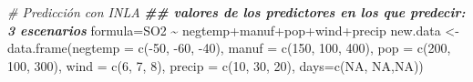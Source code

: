 \documentclass[
]{book}
\newenvironment{Shaded}{\begin{snugshade}}{\end{snugshade}}
\newcommand{\AttributeTok}[1]{\textcolor[rgb]{0.77,0.63,0.00}{#1}}
\newcommand{\CommentTok}[1]{\textcolor[rgb]{0.56,0.35,0.01}{\textit{#1}}}
\newcommand{\ConstantTok}[1]{\textcolor[rgb]{0.00,0.00,0.00}{#1}}
\newcommand{\DecValTok}[1]{\textcolor[rgb]{0.00,0.00,0.81}{#1}}
\newcommand{\DocumentationTok}[1]{\textcolor[rgb]{0.56,0.35,0.01}{\textbf{\textit{#1}}}}
\newcommand{\FunctionTok}[1]{\textcolor[rgb]{0.00,0.00,0.00}{#1}}
\newcommand{\NormalTok}[1]{#1}
\newcommand{\OtherTok}[1]{\textcolor[rgb]{0.56,0.35,0.01}{#1}}
\newcommand{\SpecialCharTok}[1]{\textcolor[rgb]{0.00,0.00,0.00}{#1}}
\begin{document}
\begin{Shaded}
\begin{Highlighting}[]
\CommentTok{\# Predicción con INLA}
\DocumentationTok{\#\# valores de los predictores en los que predecir: 3 escenarios}
\NormalTok{formula}\OtherTok{=}\NormalTok{SO2 }\SpecialCharTok{\textasciitilde{}}\NormalTok{ negtemp}\SpecialCharTok{+}\NormalTok{manuf}\SpecialCharTok{+}\NormalTok{pop}\SpecialCharTok{+}\NormalTok{wind}\SpecialCharTok{+}\NormalTok{precip}
\NormalTok{new.data }\OtherTok{\textless{}{-}} \FunctionTok{data.frame}\NormalTok{(}\AttributeTok{negtemp =} \FunctionTok{c}\NormalTok{(}\SpecialCharTok{{-}}\DecValTok{50}\NormalTok{, }\SpecialCharTok{{-}}\DecValTok{60}\NormalTok{, }\SpecialCharTok{{-}}\DecValTok{40}\NormalTok{), }
                       \AttributeTok{manuf =} \FunctionTok{c}\NormalTok{(}\DecValTok{150}\NormalTok{, }\DecValTok{100}\NormalTok{, }\DecValTok{400}\NormalTok{), }
                       \AttributeTok{pop =} \FunctionTok{c}\NormalTok{(}\DecValTok{200}\NormalTok{, }\DecValTok{100}\NormalTok{, }\DecValTok{300}\NormalTok{), }
                       \AttributeTok{wind =} \FunctionTok{c}\NormalTok{(}\DecValTok{6}\NormalTok{, }\DecValTok{7}\NormalTok{, }\DecValTok{8}\NormalTok{), }
                       \AttributeTok{precip =} \FunctionTok{c}\NormalTok{(}\DecValTok{10}\NormalTok{, }\DecValTok{30}\NormalTok{, }\DecValTok{20}\NormalTok{),}
                       \AttributeTok{days=}\FunctionTok{c}\NormalTok{(}\ConstantTok{NA}\NormalTok{, }\ConstantTok{NA}\NormalTok{,}\ConstantTok{NA}\NormalTok{))}


\end{Highlighting}
\end{Shaded}
\end{document}
